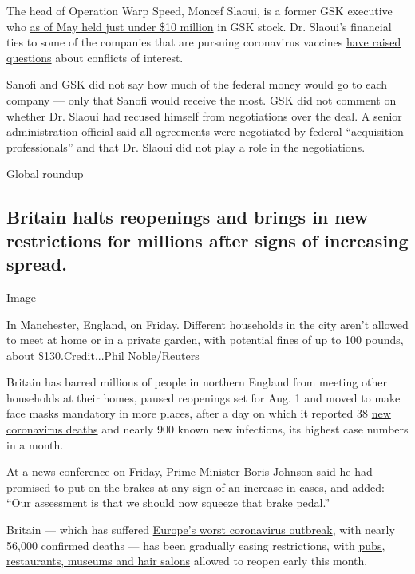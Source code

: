 The head of Operation Warp Speed, Moncef Slaoui, is a former GSK
executive who
\href{https://www.nytimes3xbfgragh.onion/2020/05/20/health/coronavirus-vaccine-czar.html}{as
of May held just under \$10 million} in GSK stock. Dr. Slaoui's
financial ties to some of the companies that are pursuing coronavirus
vaccines
\href{https://www.nytimes3xbfgragh.onion/2020/07/15/us/politics/vaccine-Slaoui-coronavirus-trump.html}{have
raised questions} about conflicts of interest.

Sanofi and GSK did not say how much of the federal money would go to
each company --- only that Sanofi would receive the most. GSK did not
comment on whether Dr. Slaoui had recused himself from negotiations over
the deal. A senior administration official said all agreements were
negotiated by federal ``acquisition professionals'' and that Dr. Slaoui
did not play a role in the negotiations.

Global roundup

\hypertarget{britain-halts-reopenings-and-brings-in-new-restrictions-for-millions-after-signs-of-increasing-spread}{%
\subsection{Britain halts reopenings and brings in new restrictions for
millions after signs of increasing
spread.}\label{britain-halts-reopenings-and-brings-in-new-restrictions-for-millions-after-signs-of-increasing-spread}}

Image

In Manchester, England, on Friday. Different households in the city
aren't allowed to meet at home or in a private garden, with potential
fines of up to 100 pounds, about \$130.Credit...Phil Noble/Reuters

Britain has barred millions of people in northern England from meeting
other households at their homes, paused reopenings set for Aug. 1 and
moved to make face masks mandatory in more places, after a day on which
it reported 38
\href{https://www.nytimes3xbfgragh.onion/interactive/2020/world/europe/united-kingdom-coronavirus-cases.html}{new
coronavirus deaths} and nearly 900 known new infections, its highest
case numbers in a month.

At a news conference on Friday, Prime Minister Boris Johnson said he had
promised to put on the brakes at any sign of an increase in cases, and
added: ``Our assessment is that we should now squeeze that brake
pedal.''

Britain --- which has suffered
\href{https://www.nytimes3xbfgragh.onion/2020/07/30/world/europe/UK-deaths-coronavirus-europe.html}{Europe's
worst coronavirus outbreak}, with nearly 56,000 confirmed deaths --- has
been gradually easing restrictions, with
\href{https://www.nytimes3xbfgragh.onion/2020/06/23/world/europe/uk-coronavirus-reopening.html}{pubs,
restaurants, museums and hair salons} allowed to reopen early this
month.

